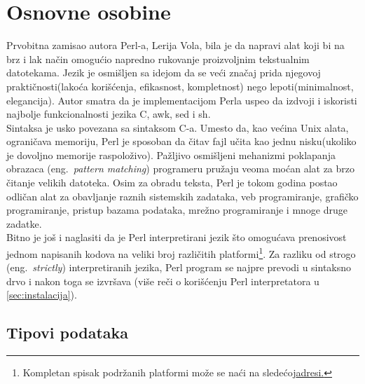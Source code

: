 \documentclass[a4paper]{article}
\begin{document}
\section{Osnovne osobine}
\label{sec:osobine}

Prvobitna zamisao autora Perl-a, Lerija Vola, bila je da napravi alat koji bi na brz i lak način omogućio napredno rukovanje proizvoljnim tekstualnim datotekama. Jezik je osmišljen sa idejom da se veći značaj prida njegovoj praktičnosti(lakoća korišćenja, efikasnost, kompletnost) nego lepoti(minimalnost, elegancija). Autor smatra da je implementacijom Perla uspeo da izdvoji i iskoristi najbolje funkcionalnosti jezika C, awk, sed i sh\cite{wallperl}.\\
Sintaksa je usko povezana sa sintaksom C-a. Umesto da, kao većina Unix alata, ograničava memoriju, Perl je sposoban da čitav fajl učita kao jednu nisku(ukoliko je dovoljno memorije raspoloživo). Pažljivo osmišljeni mehanizmi poklapanja obrazaca (eng.~{\em pattern matching}) programeru pružaju veoma moćan alat za brzo čitanje velikih datoteka.
Osim za obradu teksta, Perl je tokom godina postao odličan alat za obavljanje raznih sistemskih zadataka, veb programiranje, grafičko programiranje, pristup bazama podataka, mrežno programiranje i mnoge druge zadatke. \\ 

Bitno je još i naglasiti da je Perl interpretirani jezik što omogućava prenosivost jednom napisanih kodova na veliki broj različitih platformi\footnote{Kompletan spisak podržanih platformi može se naći na sledećoj\href{https://perldoc.perl.org/perlport.html#Supported-Platforms}{adresi.}}. Za razliku od strogo (eng.~{\em strictly}) interpretiranih jezika, Perl program se najpre prevodi u sintaksno drvo i nakon toga se izvršava (više reči o korišćenju Perl interpretatora u 
\ref{sec:instalacija}).

\subsection{Tipovi podataka}
\end{document}
